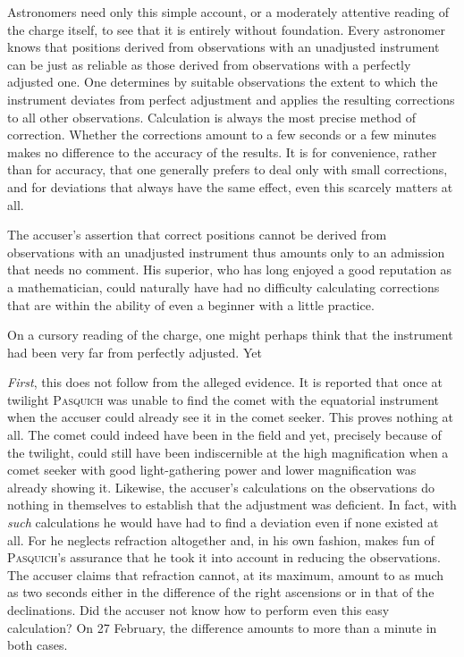 Astronomers need only this simple account, or a moderately attentive reading of the charge itself, to see that it is entirely without foundation. Every astronomer knows that positions derived from observations with an unadjusted instrument can be just as reliable as those derived from observations with a perfectly adjusted one. One determines by suitable observations the extent to which the instrument deviates from perfect adjustment and applies the resulting corrections to all other observations. Calculation is always the most precise method of correction. Whether the  corrections amount to a few seconds or a few minutes makes no difference to the accuracy of the results. It is for convenience, rather than for accuracy, that one generally prefers to deal only with small corrections, and for deviations that always have the same effect, even this scarcely matters at all.

The accuser's assertion that correct positions cannot be derived from observations with an unadjusted instrument thus amounts only to an admission that needs no comment. His superior, who has long enjoyed a good reputation as a mathematician, could naturally have had no difficulty calculating corrections that are within the ability of even a beginner with a little practice.

On a cursory reading of the charge, one might perhaps think that the instrument had been very far from perfectly adjusted. Yet

\emph{First}, this does not follow from the alleged evidence. It is reported that once at twilight \textsc{Pasquich} was unable to find the comet with the equatorial instrument when the accuser could already see it in the comet seeker. This proves nothing at all. The comet could indeed have been in the field and yet, precisely because of the twilight, could still have been indiscernible at the high magnification when a comet seeker with good light-gathering power and lower magnification was already showing it. Likewise, the accuser's calculations on the observations do nothing in themselves to establish that the adjustment was deficient. In fact, with \emph{such} calculations he would have had to find a deviation even if none existed at all. For he neglects refraction altogether and, in his own fashion, makes fun of \textsc{Pasquich}'s assurance that he took it into account in reducing the observations. The accuser claims that refraction cannot, at its maximum, amount to as much as two seconds either in the difference of the right ascensions or in that of the declinations. Did the accuser not know how to perform even this easy calculation? On 27 February, the difference amounts to more than a minute in both cases.

